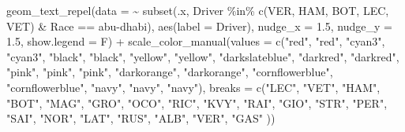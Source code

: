 \documentclass[
]{book}
\newenvironment{Shaded}{\begin{snugshade}}{\end{snugshade}}
\newcommand{\AttributeTok}[1]{\textcolor[rgb]{0.77,0.63,0.00}{#1}}
\newcommand{\FloatTok}[1]{\textcolor[rgb]{0.00,0.00,0.81}{#1}}
\newcommand{\FunctionTok}[1]{\textcolor[rgb]{0.00,0.00,0.00}{#1}}
\newcommand{\NormalTok}[1]{#1}
\newcommand{\SpecialCharTok}[1]{\textcolor[rgb]{0.00,0.00,0.00}{#1}}
\newcommand{\StringTok}[1]{\textcolor[rgb]{0.31,0.60,0.02}{#1}}
\begin{document}
\begin{Shaded}
\begin{Highlighting}[]
  \FunctionTok{geom\_text\_repel}\NormalTok{(}\AttributeTok{data =} \SpecialCharTok{\textasciitilde{}} \FunctionTok{subset}\NormalTok{(.x, Driver }\SpecialCharTok{\%in\%} \FunctionTok{c}\NormalTok{(}\StringTok{\textquotesingle{}VER\textquotesingle{}}\NormalTok{, }\StringTok{\textquotesingle{}HAM\textquotesingle{}}\NormalTok{, }\StringTok{\textquotesingle{}BOT\textquotesingle{}}\NormalTok{, }\StringTok{\textquotesingle{}LEC\textquotesingle{}}\NormalTok{, }\StringTok{\textquotesingle{}VET\textquotesingle{}}\NormalTok{) }\SpecialCharTok{\&}\NormalTok{ Race }\SpecialCharTok{==} \StringTok{\textquotesingle{}abu{-}dhabi\textquotesingle{}}\NormalTok{),}
            \FunctionTok{aes}\NormalTok{(}\AttributeTok{label =}\NormalTok{ Driver),}
            \AttributeTok{nudge\_x =} \FloatTok{1.5}\NormalTok{, }\AttributeTok{nudge\_y =} \FloatTok{1.5}\NormalTok{, }\AttributeTok{show.legend =}\NormalTok{ F) }\SpecialCharTok{+}
  \FunctionTok{scale\_color\_manual}\NormalTok{(}\AttributeTok{values =} \FunctionTok{c}\NormalTok{(}\StringTok{"red"}\NormalTok{, }\StringTok{"red"}\NormalTok{, }
                                \StringTok{"cyan3"}\NormalTok{, }\StringTok{"cyan3"}\NormalTok{, }
                                \StringTok{"black"}\NormalTok{, }\StringTok{"black"}\NormalTok{, }
                                \StringTok{"yellow"}\NormalTok{, }\StringTok{"yellow"}\NormalTok{,}
                                \StringTok{"darkslateblue"}\NormalTok{,}
                                \StringTok{"darkred"}\NormalTok{, }\StringTok{"darkred"}\NormalTok{, }
                                \StringTok{"pink"}\NormalTok{, }\StringTok{"pink"}\NormalTok{, }\StringTok{"pink"}\NormalTok{,}
                                \StringTok{"darkorange"}\NormalTok{, }\StringTok{"darkorange"}\NormalTok{,}
                                \StringTok{"cornflowerblue"}\NormalTok{, }\StringTok{"cornflowerblue"}\NormalTok{,}
                                \StringTok{"navy"}\NormalTok{, }\StringTok{"navy"}\NormalTok{, }\StringTok{"navy"}\NormalTok{),}
                     \AttributeTok{breaks =} \FunctionTok{c}\NormalTok{(}\StringTok{"LEC"}\NormalTok{, }\StringTok{"VET"}\NormalTok{,}
                                \StringTok{"HAM"}\NormalTok{, }\StringTok{"BOT"}\NormalTok{,}
                                \StringTok{"MAG"}\NormalTok{, }\StringTok{"GRO"}\NormalTok{,}
                                \StringTok{"OCO"}\NormalTok{, }\StringTok{"RIC"}\NormalTok{,}
                                \StringTok{"KVY"}\NormalTok{,}
                                \StringTok{"RAI"}\NormalTok{, }\StringTok{"GIO"}\NormalTok{,}
                                \StringTok{"STR"}\NormalTok{, }\StringTok{"PER"}\NormalTok{,  }
                                \StringTok{"SAI"}\NormalTok{, }\StringTok{"NOR"}\NormalTok{,}
                                \StringTok{"LAT"}\NormalTok{, }\StringTok{"RUS"}\NormalTok{,}
                                \StringTok{"ALB"}\NormalTok{, }\StringTok{"VER"}\NormalTok{, }\StringTok{"GAS"}
\NormalTok{                                )) }
\end{Highlighting}
\end{Shaded}
\end{document}
